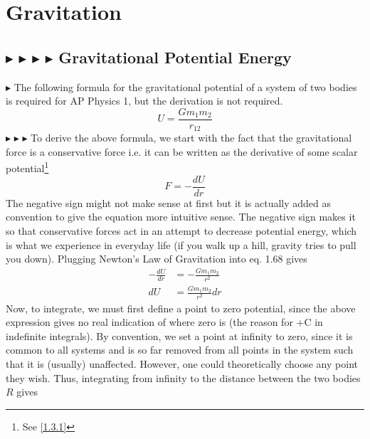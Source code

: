 \clearpage

%
%
%
%

\section{Gravitation}

%
%
\subsection{\color{OrangeRed} $\blacktriangleright$ \color{PineGreen} $\blacktriangleright$ \color{Goldenrod} $\blacktriangleright$ \color{Orchid} $\blacktriangleright$ \color{black} Gravitational Potential Energy}
\color{OrangeRed} $\blacktriangleright$ \color{black} The following formula for the gravitational potential of a system of two bodies is required for AP Physics 1, but the derivation is not required.
\begin{equation}
    U = \frac{Gm_1m_2}{r_{12}}
\end{equation}
\noindent \color{PineGreen} $\blacktriangleright$ \color{Goldenrod} $\blacktriangleright$ \color{Orchid} $\blacktriangleright$ \color{black} To derive the above formula, we start with the fact that the gravitational force is a conservative force i.e. it can be written as the derivative of some scalar potential\footnote{See \ref{1.3.1}}
\begin{equation}
    F = -\frac{dU}{dr}
\end{equation}
\noindent The negative sign might not make sense at first but it is actually added as convention to give the equation more intuitive sense. The negative sign makes it so that conservative forces act in an attempt to decrease potential energy, which is what we experience in everyday life (if you walk up a hill, gravity tries to pull you down). Plugging Newton's Law of Gravitation into eq. 1.68 gives
\begin{align*}
    -\frac{dU}{dr} &= -\frac{Gm_1m_2}{r^2} \\
    dU &= \frac{Gm_1m_2}{r^2}dr
\end{align*}
\noindent Now, to integrate, we must first define a point to zero potential, since the above expression gives no real indication of where zero is (the reason for +C in indefinite integrals). By convention, we set a point at infinity to zero, since it is common to all systems and is so far removed from all points in the system such that it is (usually) unaffected. However, one could theoretically choose any point they wish. Thus, integrating from infinity to the distance between the two bodies $R$ gives
